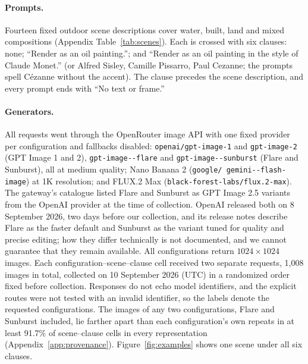 \documentclass[10pt]{article}
\begin{document}
\paragraph{Prompts.}
Fourteen fixed outdoor scene descriptions cover water, built, land and mixed compositions
(Appendix Table~\ref{tab:scenes}). Each is crossed with six clauses: none; ``Render as an oil
painting.''; and ``Render as an oil painting in the style of Claude Monet.'' (or Alfred Sisley,
Camille Pissarro, Paul Cezanne; the prompts spell C\'ezanne without the accent). The clause
precedes the scene description, and every prompt ends with ``No text or frame.''

\paragraph{Generators.}
All requests went through the OpenRouter image API with one fixed provider per configuration and
fallbacks disabled: \texttt{openai/\allowbreak gpt-\allowbreak image-1} and
\texttt{gpt-\allowbreak image-2} (GPT Image 1 and 2), \texttt{gpt-\allowbreak image--\allowbreak flare} and \texttt{gpt-\allowbreak image--\allowbreak sunburst}
(Flare and Sunburst), all at medium quality; Nano Banana 2 (\texttt{google/\allowbreak
gemini--\allowbreak flash-\allowbreak image}) at 1K resolution; and FLUX.2 Max
(\texttt{black-\allowbreak forest-\allowbreak labs/\allowbreak flux.2-\allowbreak max}). The
gateway's catalogue listed Flare and Sunburst as GPT Image 2.5 variants from the OpenAI provider at
the time of collection. OpenAI released both on 8 September 2026, two days before our collection,
and its release notes describe Flare as the faster default and Sunburst as the variant tuned for
quality and precise editing; how they differ technically is not documented, and we cannot
guarantee that they remain available. All configurations return $1024\times1024$ images. Each
configuration--scene--clause cell received two separate requests, 1,008 images in total, collected
on 10 September 2026 (UTC) in a randomized order fixed before collection. Responses do not echo
model identifiers, and the explicit routes were not tested with an invalid identifier, so the
labels denote the requested configurations. The images of any two configurations, Flare and
Sunburst included, lie farther apart than each configuration's own repeats in at least 91.7\% of
scene--clause cells in every representation (Appendix~\ref{app:provenance}).
Figure~\ref{fig:examples} shows one scene under all six clauses.
\end{document}
